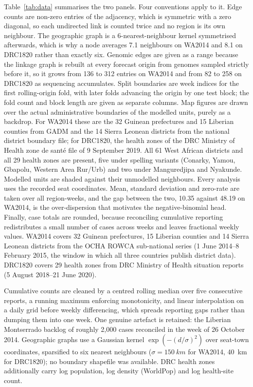 \documentclass[conference]{IEEEtran}
\begin{document}
Table~\ref{tab:data} summarises the two panels. Four conventions apply to it. Edge counts are non-zero entries of the adjacency, which is symmetric with a zero diagonal, so each undirected link is counted twice and no region is its own neighbour. The geographic graph is a 6-nearest-neighbour kernel symmetrised afterwards, which is why a node averages 7.1 neighbours on WA2014 and 8.1 on DRC1820 rather than exactly six. Genomic edges are given as a range because the linkage graph is rebuilt at every forecast origin from genomes sampled strictly before it, so it grows from 136 to 312 entries on WA2014 and from 82 to 258 on DRC1820 as sequencing accumulates. Split boundaries are week indices for the first rolling-origin fold, with later folds advancing the origin by one test block; the fold count and block length are given as separate columns. Map figures are drawn over the actual administrative boundaries of the modelled units, purely as a backdrop. For WA2014 these are the 32 Guinean prefectures and 15 Liberian counties from GADM and the 14 Sierra Leonean districts from the national district boundary file; for DRC1820, the health zones of the DRC Ministry of Health zone de sant\'e file of 9 September 2019. All 61 West African districts and all 29 health zones are present, five under spelling variants (Conarky, Yamou, Gbapolu, Western Area Rur/Urb) and two under Manguredjipa and Nyakunde. Modelled units are shaded against their unmodelled neighbours. Every analysis uses the recorded seat coordinates. Mean, standard deviation and zero-rate are taken over all region-weeks, and the gap between the two, 10.35 against 48.19 on WA2014, is the over-dispersion that motivates the negative-binomial head. Finally, case totals are rounded, because reconciling cumulative reporting redistributes a small number of cases across weeks and leaves fractional weekly values. WA2014 covers 32 Guinean prefectures, 15 Liberian counties and 14 Sierra Leonean districts from the OCHA ROWCA sub-national series (1 June 2014--8 February 2015, the window in which all three countries publish district data). DRC1820 covers 29 health zones from DRC Ministry of Health situation reports (5 August 2018--21 June 2020).

Cumulative counts are cleaned by a centred rolling median over five consecutive reports, a running maximum enforcing monotonicity, and linear interpolation on a daily grid before weekly differencing, which spreads reporting gaps rather than dumping them into one week. One genuine artefact is retained: the Liberian Montserrado backlog of roughly 2{,}000 cases reconciled in the week of 26 October 2014. Geographic graphs use a Gaussian kernel $\exp(-(d/\sigma)^2)$ over seat-town coordinates, sparsified to six nearest neighbours ($\sigma=\SI{150}{km}$ for WA2014, \SI{40}{km} for DRC1820); no boundary shapefile was available. DRC health zones additionally carry log population, log density (WorldPop) and log health-site count.
\end{document}
